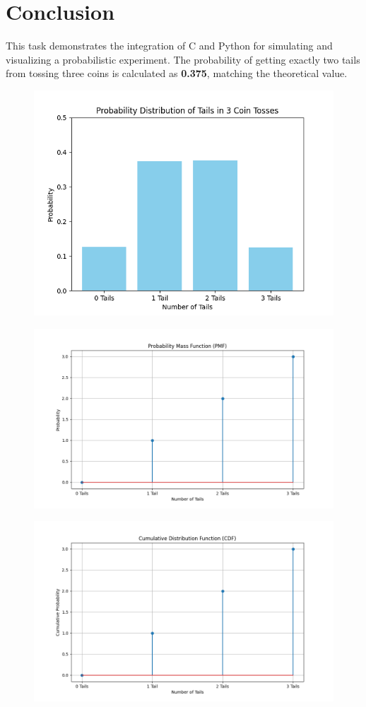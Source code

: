 \documentclass[journal]{IEEEtran}
\begin{document}
\section*{Conclusion}
This task demonstrates the integration of C and Python for simulating and visualizing a probabilistic experiment. The probability of getting exactly two tails from tossing three coins is calculated as \textbf{0.375}, matching the theoretical value.

\begin{figure}[h!]
   \centering
   \includegraphics[width=\columnwidth]{figs/fig1.png}
   \end{figure}
\begin{figure}[h!]
   \centering
   \includegraphics[width=\columnwidth]{figs/fig2.png}
   \end{figure}
\begin{figure}[h!]
   \centering
   \includegraphics[width=\columnwidth]{figs/fig3.png}
   \end{figure}
\end{document}
